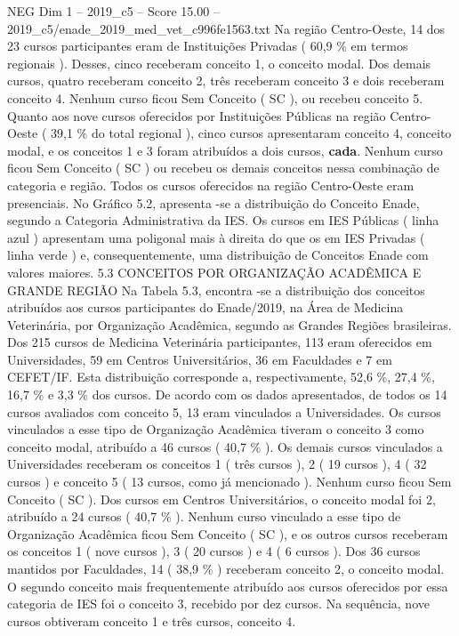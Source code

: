 \begin{textsample}{NEG Dim 1 – 2019\_c5 – Score 15.00 – 2019\_c5/enade\_2019\_med\_vet\_c996fe1563.txt}
Na região Centro-Oeste, 14 dos 23 cursos participantes eram de Instituições Privadas ( 60,9 \% em termos regionais ).
Desses, cinco receberam conceito 1, o conceito modal.
Dos demais cursos, quatro receberam conceito 2, três receberam conceito 3 e dois receberam conceito 4.
Nenhum curso ficou Sem Conceito ( SC ), ou recebeu conceito 5.
Quanto aos nove cursos oferecidos por Instituições Públicas na região Centro-Oeste ( 39,1 \% do total regional ), cinco cursos apresentaram conceito 4, conceito modal, e os conceitos 1 e 3 foram atribuídos a dois cursos, \textbf{cada}.
Nenhum curso ficou Sem Conceito ( SC ) ou recebeu os demais conceitos nessa combinação de categoria e região.
Todos os cursos oferecidos na região Centro-Oeste eram presenciais.
No Gráfico 5.2, apresenta -se a distribuição do Conceito Enade, segundo a Categoria Administrativa da IES.
Os cursos em IES Públicas ( linha azul ) apresentam uma poligonal mais à direita do que os em IES Privadas ( linha verde ) e, consequentemente, uma distribuição de Conceitos Enade com valores maiores. 5.3 CONCEITOS POR ORGANIZAÇÃO ACADÊMICA E GRANDE REGIÃO Na Tabela 5.3, encontra -se a distribuição dos conceitos atribuídos aos cursos participantes do Enade/2019, na Área de Medicina Veterinária, por Organização Acadêmica, segundo as Grandes Regiões brasileiras.
Dos 215 cursos de Medicina Veterinária participantes, 113 eram oferecidos em Universidades, 59 em Centros Universitários, 36 em Faculdades e 7 em CEFET/IF.
Esta distribuição corresponde a, respectivamente, 52,6 \%, 27,4 \%, 16,7 \% e 3,3 \% dos cursos.
De acordo com os dados apresentados, de todos os 14 cursos avaliados com conceito 5, 13 eram vinculados a Universidades.
Os cursos vinculados a esse tipo de Organização Acadêmica tiveram o conceito 3 como conceito modal, atribuído a 46 cursos ( 40,7 \% ).
Os demais cursos vinculados a Universidades receberam os conceitos 1 ( três cursos ), 2 ( 19 cursos ), 4 ( 32 cursos ) e conceito 5 ( 13 cursos, como já mencionado ).
Nenhum curso ficou Sem Conceito ( SC ).
Dos cursos em Centros Universitários, o conceito modal foi 2, atribuído a 24 cursos ( 40,7 \% ).
Nenhum curso vinculado a esse tipo de Organização Acadêmica ficou Sem Conceito ( SC ), e os outros cursos receberam os conceitos 1 ( nove cursos ), 3 ( 20 cursos ) e 4 ( 6 cursos ).
Dos 36 cursos mantidos por Faculdades, 14 ( 38,9 \% ) receberam conceito 2, o conceito modal.
O segundo conceito mais frequentemente atribuído aos cursos oferecidos por essa categoria de IES foi o conceito 3, recebido por dez cursos.
Na sequência, nove cursos obtiveram conceito 1 e três cursos, conceito 4.

\end{textsample}

